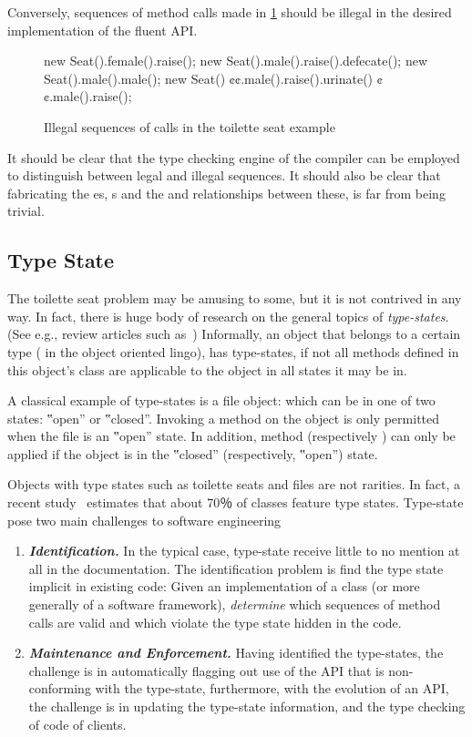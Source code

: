 Conversely, sequences of method calls made in \cref{Figure:toilette:illegal} 
  should be illegal in the desired implementation of the fluent API.

\begin{figure}[htbp]
  \begin{JAVA}
new Seat().female().raise();
new Seat().male().raise().defecate();
new Seat().male().male();
new Seat()
     ¢¢.male().raise().urinate()
     ¢¢.male().raise();
  \end{JAVA}
  \caption{Illegal sequences of calls in the toilette seat example}
  \label{Figure:toilette:illegal}
\end{figure}
It should be clear that the type checking engine of the compiler can
be employed to distinguish between legal and illegal sequences.
It should also be clear that fabricating the es, s
and the  and  relationships between these, is
far from being trivial.

\subsection{Type State}
The toilette seat problem may be amusing to some, but it is not contrived in
any way.  In fact, there is huge body of research on the general topics of
\emph{type-states}. (See e.g., review articles such
as~\cite{Aldrich:Sunshine:2009,Bierhoff:Aldrich:2005}) Informally, an object
that belongs to a certain type ( in the object oriented lingo), has
type-states, if not all methods defined in this object's class are applicable
to the object in all states it may be in.

A classical example of type-states is a file object: which can be in one of two
states: ‟open” or ‟closed”. Invoking a  method on the object is only
permitted when the file is an ‟open” state.  In addition, method 
(respectively ) can only be applied if the object is in the
‟closed” (respectively, ‟open”) state.

Objects with type states such as toilette seats and files are not rarities.
In fact, a recent study~\cite{Search:For:Aldrich} estimates 
  that about 70％ of \Java classes feature type states.
Type-state pose two main challenges to software engineering 
\begin{enumerate}
  \item \emph{\textbf{Identification.}} 
    In the typical case, type-state 
        receive little to no mention at all in the documentation.
    The identification problem is find the
    type state implicit in existing code: Given an implementation of a class
    (or more generally of a software framework), 
    \emph{determine} which sequences of method calls are valid and which violate the 
    type state hidden in the code.
  \item \emph{\textbf{Maintenance and Enforcement.}}
    Having identified the type-states, the challenge is in automatically flagging out 
      use of the API that is non-conforming with the type-state, furthermore, with the 
      evolution of an API, the challenge is in updating the type-state information, 
      and the type checking of code of clients. 
\end{enumerate}
